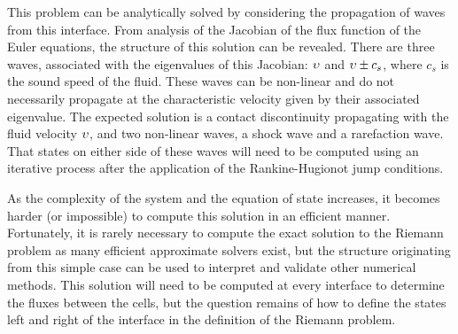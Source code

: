 
This problem can be analytically solved by considering the propagation of waves from this interface.
From analysis of the Jacobian of the flux function of the Euler equations, the structure of this solution can be revealed.
There are three waves, associated with the eigenvalues of this Jacobian: $\upsilon$ and $\upsilon\pm c_s$, where $c_s$ is the sound speed of the fluid.
These waves can be non-linear and do not necessarily propagate at the characteristic velocity given by their associated eigenvalue.
The expected solution is a contact discontinuity propagating with the fluid velocity $\upsilon$, and two non-linear waves, a shock wave and a rarefaction wave.
That states on either side of these waves will need to be computed using an iterative process after the application of the Rankine-Hugionot jump conditions.

As the complexity of the system and the equation of state increases, it becomes harder (or impossible) to compute this solution in an efficient manner.
Fortunately, it is rarely necessary to compute the exact solution to the Riemann problem as many efficient approximate solvers exist, but the structure originating from this simple case can be used to interpret and validate other numerical methods.
This solution will need to be computed at every interface to determine the fluxes between the cells, but the question remains of how to define the states left and right of the interface in the definition of the Riemann problem.

